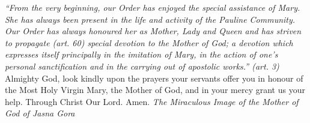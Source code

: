\pagestyle{empty}
\hspace{0pt}
\vfill

\textit{``From the very beginning, our Order has enjoyed
the special assistance of Mary. She has always been present
in the life and activity of the Pauline Community. Our Order
has always honoured her as Mother, Lady and Queen and
has striven to propagate (art. 60) special devotion to the
Mother of God; a devotion which expresses itself principally
in the imitation of Mary, in the action of one's personal
sanctification and in the carrying out of apostolic
works.'' (art. 3)}
\medbreak
Almighty God, look kindly upon the prayers your
servants offer you in honour of the Most Holy Virgin Mary,
the Mother of God, and in your mercy grant us your help.
Through Christ Our Lord. Amen.
\vfill
\textit{The Miraculous Image of the Mother of God of Jasna Gora}
\hspace{0pt}
\newpage
